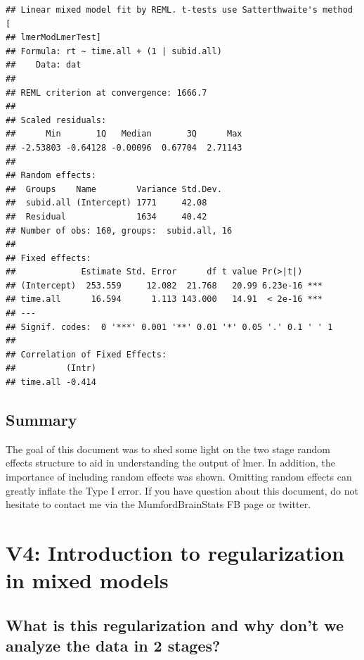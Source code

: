 \documentclass[
]{book}
\begin{document}
\begin{verbatim}
## Linear mixed model fit by REML. t-tests use Satterthwaite's method [
## lmerModLmerTest]
## Formula: rt ~ time.all + (1 | subid.all)
##    Data: dat
## 
## REML criterion at convergence: 1666.7
## 
## Scaled residuals: 
##      Min       1Q   Median       3Q      Max 
## -2.53803 -0.64128 -0.00096  0.67704  2.71143 
## 
## Random effects:
##  Groups    Name        Variance Std.Dev.
##  subid.all (Intercept) 1771     42.08   
##  Residual              1634     40.42   
## Number of obs: 160, groups:  subid.all, 16
## 
## Fixed effects:
##             Estimate Std. Error      df t value Pr(>|t|)    
## (Intercept)  253.559     12.082  21.768   20.99 6.23e-16 ***
## time.all      16.594      1.113 143.000   14.91  < 2e-16 ***
## ---
## Signif. codes:  0 '***' 0.001 '**' 0.01 '*' 0.05 '.' 0.1 ' ' 1
## 
## Correlation of Fixed Effects:
##          (Intr)
## time.all -0.414
\end{verbatim}

\hypertarget{summary}{%
\section*{Summary}\label{summary}}

The goal of this document was to shed some light on the two stage random effects structure to aid in understanding the output of lmer. In addition, the importance of including random effects was shown. Omitting random effects can greatly inflate the Type I error. If you have question about this document, do not hesitate to contact me via the MumfordBrainStats FB page or twitter.

\hypertarget{v4-introduction-to-regularization-in-mixed-models}{%
\chapter{V4: Introduction to regularization in mixed models}\label{v4-introduction-to-regularization-in-mixed-models}}

\hypertarget{what-is-this-regularization-and-why-dont-we-analyze-the-data-in-2-stages}{%
\section{What is this regularization and why don't we analyze the data in 2 stages?}\label{what-is-this-regularization-and-why-dont-we-analyze-the-data-in-2-stages}}
\end{document}
